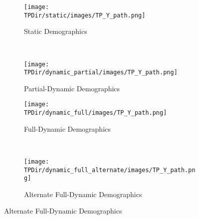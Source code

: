 \documentclass[10pt]{article}
\numberwithin{equation}{subsection}
\newcommand*{\TPDir}{../../code/Rick/OUTPUT/TP}
\begin{document}
\begin{appendices}
\begin{figure}[H]
   \caption{\label{fig:tp_agg_output}Time Path of Aggregate Output \(\hat{Y}_t\)}
   \begin{subfigure}{0.5\textwidth}
      \centering
      \texttt{[image: \\TPDir/static/images/TP\_Y\_path.png]}
      \caption{Static Demographics}
   \end{subfigure}%
   ~
   \begin{subfigure}{0.5\textwidth}
      \centering
      \texttt{[image: \\TPDir/dynamic\_partial/images/TP\_Y\_path.png]}
      \caption{Partial-Dynamic Demographics}
   \end{subfigure}
   \newline
   \begin{subfigure}{0.5\textwidth}
      \centering
      \texttt{[image: \\TPDir/dynamic\_full/images/TP\_Y\_path.png]}
      \caption{Full-Dynamic Demographics}
   \end{subfigure}%
   ~
   \begin{subfigure}{0.5\textwidth}
      \centering
      \texttt{[image: \\TPDir/dynamic\_full\_alternate/images/TP\_Y\_path.png]}
      \caption{Alternate Full-Dynamic Demographics}
   \end{subfigure}
\end{figure}

\end{appendices}
\end{document}
